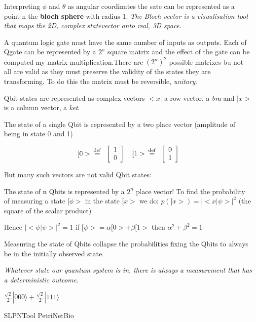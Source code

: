 Interpreting $\phi$ and $\theta$ as  angular coordinates the sate can be represented as a point n the {\bf bloch sphere} with radius 1. \emph{ The Bloch vector is a visualisation tool that maps the 2D, complex statevector onto real, 3D space.}

A quantum logic gate must have the same number of inputs as outputs. Each of Qgate can be represented by a $2^n$ square matrix and the effect of the gate can be computed my matrix multiplication.There are $(2^n)^2$ possible  matrixes bu not all are valid as they must preserve  the validity of the states they are transforming.  To do this the matrix must be reversible, \emph{unitary}.

Qbit states are represented as complex vectors  $<x|$ a row vector, a \emph{bra}  and $|x >$ is a column vector, a \emph{ket}.

The state of  a single Qbit is represented by a two place vector (amplitude of being in state 0 and 1)

\[ [0>  \hspace*{0.5em} \stackrel{\mathrm{def}}{=} \hspace*{0.5em} \left[ \begin{array}{c} 1 \\ 0 \\
 \end{array} \right] \quad
 [1>  \hspace*{0.5em} \stackrel{\mathrm{def}}{=} \hspace*{0.5em} \left[ \begin{array}{c} 0 \\ 1 \\
 \end{array} \right]\] 

But many such vectors are not valid Qbit states:



The state of n Qbits is represented by a $2^n$ place vector! To find the probability of measuring a state  
$[\phi>$
  in the state  
 $[x>$
  we do:
$p([x>) = |<x|\psi>|^2$  (the square of the scalar product)

Hence  $|<\psi|\psi>|^2 = 1$  if $[\psi> = \alpha [0> + \beta [1>$ then $\alpha^2+\beta^2 = 1$

Measuring the state of Qbits collapse the probabilities fixing the Qbits to always be in the initially observed state.

\emph{Whatever state our quantum system is in, there is always a measurement that has a deterministic outcome.}

$\frac{\sqrt{2}}{2} |000\rangle+\frac{\sqrt{2}}{2} |111\rangle$

\newpage
 {SLPNTool}
\newpage
 {PetriNetBio}


